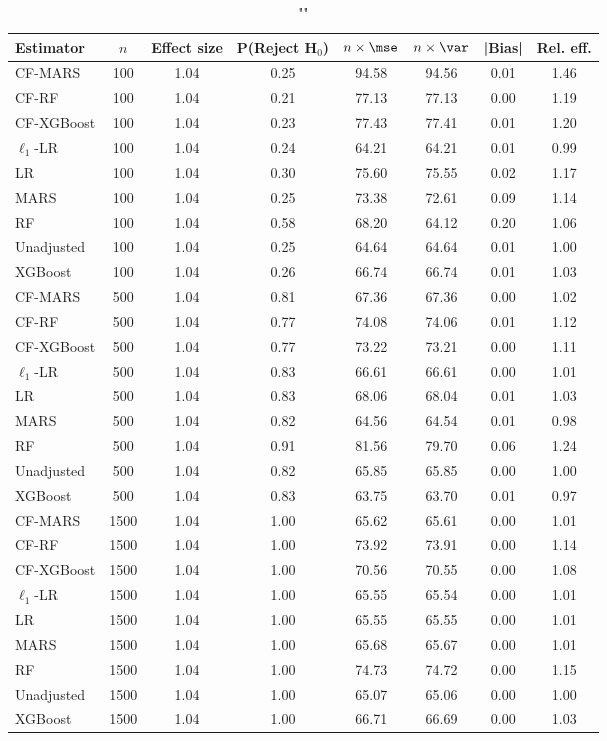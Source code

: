 \begin{table}
\centering
\caption{""}
\begin{tabular}{lccccccc}
\toprule
Estimator & $n$ & Effect size & P(Reject H$_0$) & $n\times\mse$ & $n\times \var$ & |Bias| & Rel. eff.\\ \midrule
CF-MARS & 100 & 1.04 & 0.25 & 94.58 & 94.56 & 0.01 & 1.46 \\ 
CF-RF & 100 & 1.04 & 0.21 & 77.13 & 77.13 & 0.00 & 1.19 \\ 
CF-XGBoost & 100 & 1.04 & 0.23 & 77.43 & 77.41 & 0.01 & 1.20 \\ 
$\ell_1$-LR & 100 & 1.04 & 0.24 & 64.21 & 64.21 & 0.01 & 0.99 \\ 
LR & 100 & 1.04 & 0.30 & 75.60 & 75.55 & 0.02 & 1.17 \\ 
MARS & 100 & 1.04 & 0.25 & 73.38 & 72.61 & 0.09 & 1.14 \\ 
RF & 100 & 1.04 & 0.58 & 68.20 & 64.12 & 0.20 & 1.06 \\ 
Unadjusted & 100 & 1.04 & 0.25 & 64.64 & 64.64 & 0.01 & 1.00 \\ 
XGBoost & 100 & 1.04 & 0.26 & 66.74 & 66.74 & 0.01 & 1.03 \\ \addlinespace 
CF-MARS & 500 & 1.04 & 0.81 & 67.36 & 67.36 & 0.00 & 1.02 \\ 
CF-RF & 500 & 1.04 & 0.77 & 74.08 & 74.06 & 0.01 & 1.12 \\ 
CF-XGBoost & 500 & 1.04 & 0.77 & 73.22 & 73.21 & 0.00 & 1.11 \\ 
$\ell_1$-LR & 500 & 1.04 & 0.83 & 66.61 & 66.61 & 0.00 & 1.01 \\ 
LR & 500 & 1.04 & 0.83 & 68.06 & 68.04 & 0.01 & 1.03 \\ 
MARS & 500 & 1.04 & 0.82 & 64.56 & 64.54 & 0.01 & 0.98 \\ 
RF & 500 & 1.04 & 0.91 & 81.56 & 79.70 & 0.06 & 1.24 \\ 
Unadjusted & 500 & 1.04 & 0.82 & 65.85 & 65.85 & 0.00 & 1.00 \\ 
XGBoost & 500 & 1.04 & 0.83 & 63.75 & 63.70 & 0.01 & 0.97 \\ \addlinespace 
CF-MARS & 1500 & 1.04 & 1.00 & 65.62 & 65.61 & 0.00 & 1.01 \\ 
CF-RF & 1500 & 1.04 & 1.00 & 73.92 & 73.91 & 0.00 & 1.14 \\ 
CF-XGBoost & 1500 & 1.04 & 1.00 & 70.56 & 70.55 & 0.00 & 1.08 \\ 
$\ell_1$-LR & 1500 & 1.04 & 1.00 & 65.55 & 65.54 & 0.00 & 1.01 \\ 
LR & 1500 & 1.04 & 1.00 & 65.55 & 65.55 & 0.00 & 1.01 \\ 
MARS & 1500 & 1.04 & 1.00 & 65.68 & 65.67 & 0.00 & 1.01 \\ 
RF & 1500 & 1.04 & 1.00 & 74.73 & 74.72 & 0.00 & 1.15 \\ 
Unadjusted & 1500 & 1.04 & 1.00 & 65.07 & 65.06 & 0.00 & 1.00 \\ 
XGBoost & 1500 & 1.04 & 1.00 & 66.71 & 66.69 & 0.00 & 1.03 \\
\bottomrule
\end{tabular}
\end{table}

